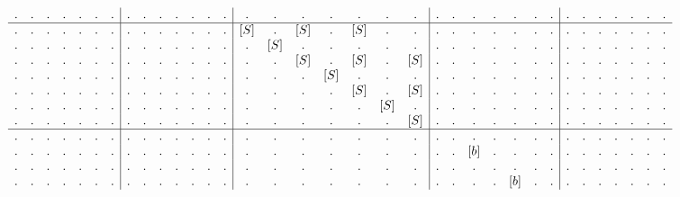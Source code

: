 \begin{example}
\begin{align}
\begin{array}{c c c c c c c | c c c c c c c | c c c c c c c | c c c c c c c | c c c c c c c}
. & . & . & . & . & . & .   &   . & .   & . & .   & . & .   & .   &   . & .           & . & .           & . & .           & .  &  . & . & .            & . & .            & . & .             &  . & . & .             & . & .             & . & .               \\
\hline                                                                                
. & . & . & . & . & . & .   &   . & . & . & . & . & . & .   &   [S] & .   & [S] & .   & [S] & .   & .    &  . & . & . & . & . & . & .  &  . & . & . & . & . & . & .   \\
. & . & . & . & . & . & .   &   . & . & . & . & . & . & .   &   .   & [S] & .   & .   & .   & .   & .    &  . & . & . & . & . & . & .  &  . & . & . & . & . & . & .   \\
. & . & . & . & . & . & .   &   . & . & . & . & . & . & .   &   .   & .   & [S] & .   & [S] & .   & [S]  &  . & . & . & . & . & . & .  &  . & . & . & . & . & . & .   \\
. & . & . & . & . & . & .   &   . & . & . & . & . & . & .   &   .   & .   & .   & [S] & .   & .   & .    &  . & . & . & . & . & . & .  &  . & . & . & . & . & . & .   \\
. & . & . & . & . & . & .   &   . & . & . & . & . & . & .   &   .   & .   & .   & .   & [S] & .   & [S]  &  . & . & . & . & . & . & .  &  . & . & . & . & . & . & .   \\
. & . & . & . & . & . & .   &   . & . & . & . & . & . & .   &   .   & .   & .   & .   & .   & [S] & .    &  . & . & . & . & . & . & .  &  . & . & . & . & . & . & .   \\
. & . & . & . & . & . & .   &   . & . & . & . & . & . & .   &   .   & .   & .   & .   & .   & .   & [S]  &  . & . & . & . & . & . & .  &  . & . & . & . & . & . & .   \\
\hline                                                                                
. & . & . & . & . & . & .  &  . & . & . & . & . & . & .  &  . & . & . & . & . & . & .  &  . & . & .   & . & .   & . & .    &  . & . & . & . & . & . & .   \\
. & . & . & . & . & . & .  &  . & . & . & . & . & . & .  &  . & . & . & . & . & . & .  &  . & . & [b] & . & .   & . & .    &  . & . & . & . & . & . & .   \\
. & . & . & . & . & . & .  &  . & . & . & . & . & . & .  &  . & . & . & . & . & . & .  &  . & . & .   & . & .   & . & .    &  . & . & . & . & . & . & .   \\
. & . & . & . & . & . & .  &  . & . & . & . & . & . & .  &  . & . & . & . & . & . & .  &  . & . & .   & . & [b] & . & .    &  . & . & . & . & . & . & .   \\

\end{array}
\end{align}
\end{example}
